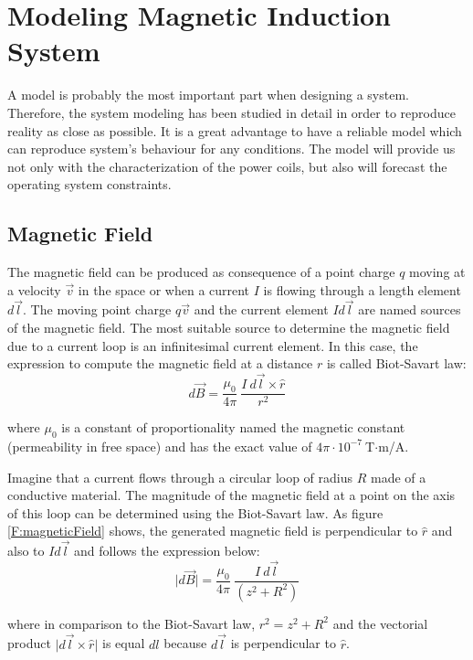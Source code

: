 \chapter{Modeling Magnetic Induction System}\label{C:modeling}
A model is probably the most important part when designing a system. Therefore, the system modeling has been studied in detail in order to reproduce reality as close as possible. It is a great advantage to have a reliable model which can reproduce system's behaviour for any conditions. The model will provide us not only with the characterization of the power coils, but also will forecast the operating system constraints.

\section{Magnetic Field}\label{sec:magneticField}
The magnetic field can be produced as consequence of a point charge $q$ moving at a velocity $\vec{v}$ in the space or when a current $I$ is flowing through a length element $d\vec{l}$. The moving point charge $q\vec{v}$ and the current element $Id\vec{l}$ are named sources of the magnetic field.
The most suitable source to determine the magnetic field due to a current loop is an infinitesimal current element. In this case, the expression to compute the magnetic field at a distance $r$ is called Biot-Savart law:
\begin{equation}
d\vec{B} = \frac{\mu_0}{4\pi}\:\frac{I\:d\vec{l}\times{\hat{r}}}{r^2}
\end{equation}

where $\mu_0$ is a constant of proportionality named the magnetic constant (permeability in free space) and has the exact value of $4\pi\cdot{10}^{-7}\:$T$\cdot$m/A.

Imagine that a current flows through a circular loop of radius $R$ made of a conductive material. The magnitude of the magnetic field at a point on the axis of this loop can be determined using the Biot-Savart law. As figure \ref{F:magneticField} shows, the generated magnetic field is perpendicular to $\hat{r}$ and also to $Id\vec{l}$ and follows the expression below:
\begin{equation*}
\lvert d\vec{B} \rvert = \frac{\mu_0}{4\pi}\:\frac{I\:d\vec{l}}{(z^2+R^2)}
\end{equation*}

where in comparison to the Biot-Savart law, $r^2=z^2+R^2$ and the vectorial product $\lvert d\vec{l}\times{\hat{r}}\rvert$ is equal $dl$ because $d\vec{l}$ is perpendicular to $\hat{r}$.

